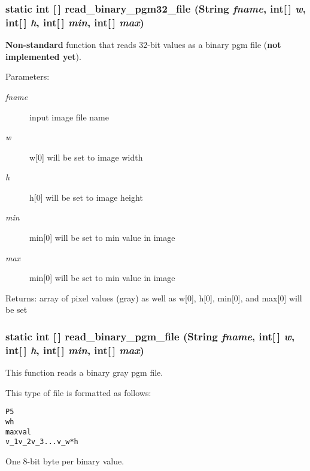 \subsubsection{\setlength{\rightskip}{0pt plus 5cm}static int [$\,$] read\_\-binary\_\-pgm32\_\-file (String {\em fname}, int[$\,$] {\em w}, int[$\,$] {\em h}, int[$\,$] {\em min}, int[$\,$] {\em max})\hspace{0.3cm}{\tt  [static]}}\label{class_c_s_image_viewer_1_1pnm_helper_f442d2c5f29538b8846cf9f5315a5f43}


{\bf Non-standard} function that reads 32-bit values as a binary pgm file ({\bf not implemented yet}). 

\begin{Desc}
\item[Parameters:]
\begin{description}
\item[{\em fname}]input image file name \item[{\em w}]w[0] will be set to image width \item[{\em h}]h[0] will be set to image height \item[{\em min}]min[0] will be set to min value in image \item[{\em max}]min[0] will be set to min value in image\end{description}
\end{Desc}
\begin{Desc}
\item[Returns:]array of pixel values (gray) as well as w[0], h[0], min[0], and max[0] will be set \end{Desc}
\subsubsection{\setlength{\rightskip}{0pt plus 5cm}static int [$\,$] read\_\-binary\_\-pgm\_\-file (String {\em fname}, int[$\,$] {\em w}, int[$\,$] {\em h}, int[$\,$] {\em min}, int[$\,$] {\em max})\hspace{0.3cm}{\tt  [static, protected]}}\label{class_c_s_image_viewer_1_1pnm_helper_3f3225357e1bccdb373db8251b629030}


This function reads a binary gray pgm file. 

This type of file is formatted as follows: \small\begin{alltt}
    P5
    w h
    maxval
    v\_1 v\_2 v\_3 . . . v\_w*h
  \end{alltt}\normalsize 
 One 8-bit byte per binary value.

